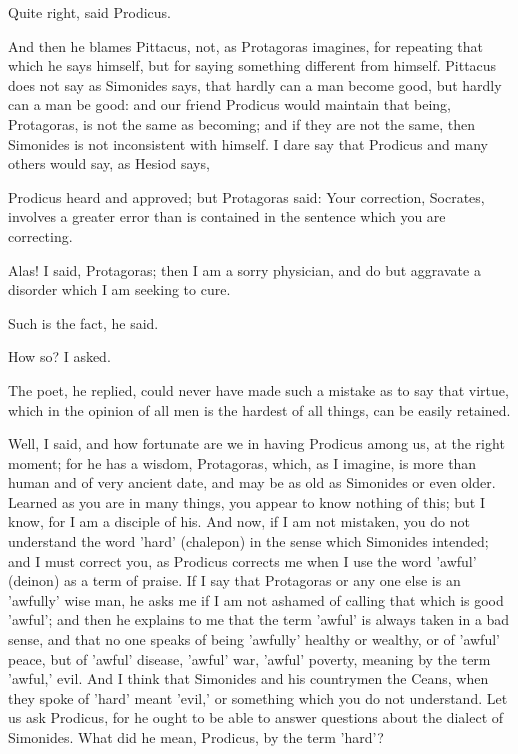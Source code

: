 \documentclass[11pt,letter]{article}
\begin{document}
\par  Quite right, said Prodicus.

\par  And then he blames Pittacus, not, as Protagoras imagines, for repeating that which he says himself, but for saying something different from himself. Pittacus does not say as Simonides says, that hardly can a man become good, but hardly can a man be good: and our friend Prodicus would maintain that being, Protagoras, is not the same as becoming; and if they are not the same, then Simonides is not inconsistent with himself. I dare say that Prodicus and many others would say, as Hesiod says,
 
\par  Prodicus heard and approved; but Protagoras said: Your correction, Socrates, involves a greater error than is contained in the sentence which you are correcting.

\par  Alas! I said, Protagoras; then I am a sorry physician, and do but aggravate a disorder which I am seeking to cure.

\par  Such is the fact, he said.

\par  How so? I asked.

\par  The poet, he replied, could never have made such a mistake as to say that virtue, which in the opinion of all men is the hardest of all things, can be easily retained.

\par  Well, I said, and how fortunate are we in having Prodicus among us, at the right moment; for he has a wisdom, Protagoras, which, as I imagine, is more than human and of very ancient date, and may be as old as Simonides or even older. Learned as you are in many things, you appear to know nothing of this; but I know, for I am a disciple of his. And now, if I am not mistaken, you do not understand the word 'hard' (chalepon) in the sense which Simonides intended; and I must correct you, as Prodicus corrects me when I use the word 'awful' (deinon) as a term of praise. If I say that Protagoras or any one else is an 'awfully' wise man, he asks me if I am not ashamed of calling that which is good 'awful'; and then he explains to me that the term 'awful' is always taken in a bad sense, and that no one speaks of being 'awfully' healthy or wealthy, or of 'awful' peace, but of 'awful' disease, 'awful' war, 'awful' poverty, meaning by the term 'awful,' evil. And I think that Simonides and his countrymen the Ceans, when they spoke of 'hard' meant 'evil,' or something which you do not understand. Let us ask Prodicus, for he ought to be able to answer questions about the dialect of Simonides. What did he mean, Prodicus, by the term 'hard'?
\end{document}

